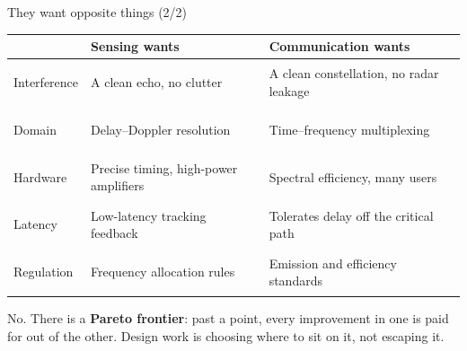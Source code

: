\begin{frame}{They want opposite things (2/2)}
  \vspace{0.2em}
  \scriptsize
  \setlength{\tabcolsep}{4pt}
  \renewcommand{\arraystretch}{1.35}
  \begin{tabularx}{\textwidth}{>{\bfseries\raggedright\arraybackslash}p{1.55cm}
      >{\raggedright\arraybackslash}X >{\raggedright\arraybackslash}X}
    \toprule
    & \textcolor{coreorange}{\textbf{Sensing wants}} & \textcolor{ranblue}{\textbf{Communication wants}} \\
    \midrule
    Interference & A clean echo, no clutter & A clean constellation, no radar leakage \\
    Domain     & Delay--Doppler resolution & Time--frequency multiplexing \\
    Hardware   & Precise timing, high-power amplifiers & Spectral efficiency, many users \\
    Latency    & Low-latency tracking feedback & Tolerates delay off the critical path \\
    Regulation & Frequency allocation rules & Emission and efficiency standards \\
    \bottomrule
  \end{tabularx}

  \vspace{0.6em}
     {No. There is a \textbf{Pareto frontier}: past a point, every improvement in
      one is paid for out of the other. Design work is choosing where to sit on
      it, not escaping it.}
\end{frame}


